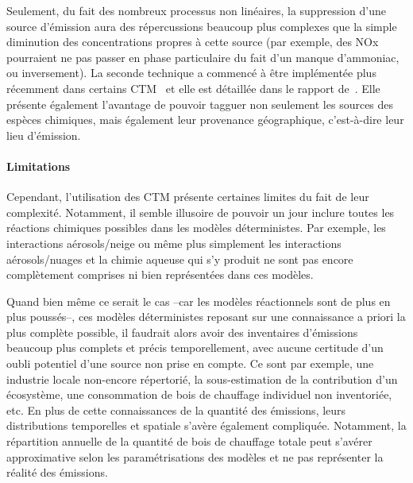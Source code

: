 Seulement, du fait des nombreux processus non linéaires, la suppression d'une source
d'émission aura des répercussions beaucoup plus complexes que la simple diminution des
concentrations propres à cette source (par exemple, des NOx pourraient ne pas passer en
phase particulaire du fait d'un manque d'ammoniac, ou inversement). 
La seconde technique a commencé à être implémentée plus récemment dans certains
CTM~\autocite{wangDevelopment2009,wagstromDevelopment2008,kranenburgSource2013,brandtContribution2013}
et elle est détaillée dans le rapport de~\cite{mirceaEuropean2020}. Elle présente également
l'avantage de pouvoir tagguer non seulement les sources des espèces chimiques, mais
également leur provenance géographique, c'est-à-dire leur lieu d'émission.

\paragraph{Limitations}%
\label{par:limitations}

Cependant, l'utilisation des CTM présente certaines limites du fait de leur complexité.
Notamment, il semble illusoire de pouvoir un jour inclure toutes les réactions chimiques
possibles dans les modèles déterministes. Par exemple, les interactions aérosols/neige ou
même plus simplement les interactions aérosols/nuages et la chimie aqueuse qui s'y produit
ne sont pas encore complètement comprises ni bien représentées dans ces modèles.

Quand bien même ce serait le cas --car les modèles réactionnels sont de plus en plus
poussés--, 
ces modèles déterministes reposant sur une connaissance a priori la plus complète
possible, il faudrait alors avoir des inventaires d'émissions beaucoup plus complets et
précis temporellement, avec aucune certitude d'un oubli potentiel d'une source non prise
en compte. Ce sont par exemple, une industrie locale non-encore répertorié, la sous-estimation de
la contribution d'un écosystème, une consommation de bois de chauffage individuel non
inventoriée, etc.
En plus de cette connaissances de la quantité des émissions, leurs distributions
temporelles et spatiale s'avère également compliquée. Notamment, la répartition annuelle
de la quantité de bois de chauffage totale peut s'avérer approximative selon les
paramétrisations des modèles et ne pas représenter la réalité des émissions.

